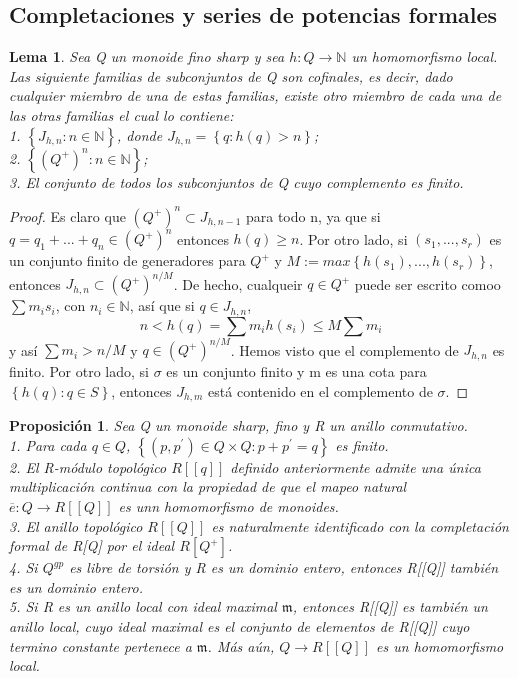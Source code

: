 \documentclass[12pt,spanish]{amsart}
\newcommand{\bb}[1]{\mathbb{#1}}
\newcommand{\fk}[1]{\mathfrak{#1}}
\newcommand{\set}[1]{\left\{{#1}\right\}}
\newtheorem{prop}[Theorem]{Proposición}
\newtheorem{lem}[Theorem]{Lema}
\theoremstyle{definition}
\theoremstyle{remark}
\begin{document}
\subsection{Completaciones y series de potencias formales}


\begin{lem}
Sea Q un monoide fino \textit{sharp} y sea $h:Q \to \bb{N}$ un homomorfismo local. Las siguiente familias de subconjuntos de Q son cofinales, es decir, dado cualquier miembro de una de estas familias, existe otro miembro de cada una de las otras familias el cual lo contiene: \\
1. $\set{J_{h,n}:n\in \bb{N}}$, donde $J_{h,n}=\set{q:h(q)>n}$; \\
2. $\set{(Q^{+})^{n}:n\in \bb{N}}$; \\
3. El conjunto de todos los subconjuntos de Q cuyo complemento es finito. 
\end{lem}

\begin{proof}
 Es claro que $(Q^{+})^{n} \subset J_{h,n-1}$ para todo n, ya que si $q=q_{1}+...+q_{n}\in (Q^{+})^{n}$ entonces $h(q)\geq n$. Por otro lado, si $(s_{1},...,s_{r})$ es un conjunto finito de generadores para $Q^{+}$ y $M:=max \set{h(s_{1}),..., h(s_{r})}$, entonces $J_{h,n} \subset (Q^{+})^{n/M}$. De hecho, cualqueir $q\in Q^{+}$ puede ser escrito comoo $\sum m_{i}s_{i}$, con $n_{i} \in \bb{N}$, así que si $q\in J_{h,n}$,
 $$n < h(q) = \sum m_{i} h(s_{i}) \leq M \sum m_{i}$$
 y así $\sum m_{i} > n/M$ y $q\in (Q^{+})^{n/M}$. Hemos visto que el complemento de $J_{h,n}$ es finito. Por otro lado, si $\sigma$ es un conjunto finito y m es una cota para $\set{h(q):q\in S}$, entonces $J_{h,m}$ está contenido en el complemento de $\sigma$. 
\end{proof}

\begin{prop}
Sea Q un monoide \textit{sharp}, fino y R un anillo conmutativo. \\
1. Para cada $q\in Q$, $\set{(p,p^{\prime})\in Q\times Q:p+p^{\prime}=q}$ es finito. \\
2. El R-módulo topológico $R[[q]]$ definido anteriormente admite una única multiplicación continua con la propiedad de que el mapeo natural $\overline{e}:Q \to R[[Q]]$ es unn homomorfismo de monoides. \\
3. El anillo topológico $R[[Q]]$ es naturalmente identificado con la completación formal de R[Q] por el ideal $R[Q^{+}]$. \\
4. Si $Q^{gp}$ es libre de torsión y R es un dominio entero, entonces R[[Q]] también es un dominio entero. \\
5. Si R es un anillo local con ideal maximal $\fk{m}$, entonces R[[Q]] es también un anillo local, cuyo ideal maximal es el conjunto de elementos de R[[Q]] cuyo termino constante pertenece a $\fk{m}$. Más aún, $Q \to R[[Q]]$ es un homomorfismo local. 
\end{prop}
\end{document}
